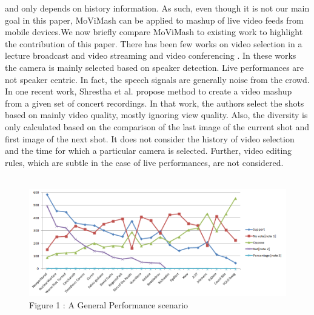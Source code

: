 \documentclass{sig-alternate}
\begin{document}
and only depends on history information. As such, even though it is not our main goal in this paper, MoViMash can be applied to mashup of live video feeds from mobile devices.We now briefly compare MoViMash to existing work to highlight the contribution of this paper. There has been few works on video selection in a lecture broadcast and video streaming and video conferencing \cite{web:3}. In these works the camera is mainly selected based on speaker detection. Live performances are not speaker centric. In fact, the speech signals are generally noise from the crowd. In one recent work, Shrestha et al. \cite{web:15} propose method to create a video mashup from a given set of concert recordings. In that work, the authors select the shots based on mainly video quality, mostly ignoring view quality. Also, the diversity is only calculated based on the comparison of the last image of the current shot and first image of the next shot. It does not consider the history of video selection and the time for which a particular camera is selected. Further, video editing rules, which are subtle in the case of live performances, are not considered.\\\\
\begin{figure}
  \includegraphics[width=\linewidth]{Graph_1.png}
  \caption{Figure 1 : A General Performance scenario}
  \label{Fig1}
\end{figure}
\end{document}
